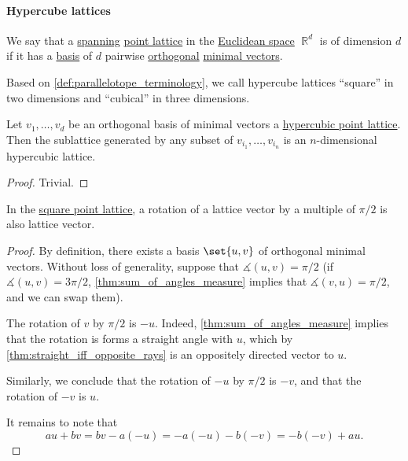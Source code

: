 \paragraph{Hypercube lattices}

\begin{definition}\label{def:hypercubic_point_lattice}
  We say that a \hyperref[thm:generated_submodule]{spanning} \hyperref[def:point_lattice]{point lattice} in the \hyperref[def:euclidean_plane]{Euclidean space} \( \BbbR^d \) is  of dimension \( d \) if it has a \hyperref[def:point_lattice_basis]{basis} of \( d \) pairwise \hyperref[def:orthogonality]{orthogonal} \hyperref[def:minimal_lattice_vector]{minimal vectors}.

  Based on \cref{def:parallelotope_terminology}, we call hypercube lattices \enquote{square} in two dimensions and \enquote{cubical} in three dimensions.
\end{definition}

\begin{proposition}\label{thm:hypercubic_point_sublattice}
  Let \( v_1, \ldots, v_d \) be an orthogonal basis of minimal vectors a \hyperref[def:hypercubic_point_lattice]{hypercubic point lattice}. Then the sublattice generated by any subset of \( v_{i_1}, \ldots, v_{i_n} \) is an \( n \)-dimensional hypercubic lattice.
\end{proposition}
\begin{proof}
  Trivial.
\end{proof}

\begin{proposition}\label{thm:hypercubic_point_lattice_vector_rotation}
  In the \hyperref[def:hypercubic_point_lattice]{square point lattice}, a rotation of a lattice vector by a multiple of \( \pi / 2 \) is also lattice vector.
\end{proposition}
\begin{proof}
  By definition, there exists a basis \( \set{ u, v } \) of orthogonal minimal vectors. Without loss of generality, suppose that \( \measuredangle(u, v) = \pi / 2 \) (if \( \measuredangle(u, v) = 3\pi / 2 \), \cref{thm:sum_of_angles_measure} implies that \( \measuredangle(v, u) = \pi / 2 \), and we can swap them).

  The rotation of \( v \) by \( \pi / 2 \) is \( -u \). Indeed, \cref{thm:sum_of_angles_measure} implies that the rotation is forms a straight angle with \( u \), which by \cref{thm:straight_iff_opposite_rays} is an oppositely directed vector to \( u \).

  Similarly, we conclude that the rotation of \( -u \) by \( \pi / 2 \) is \( -v \), and that the rotation of \( -v \) is \( u \).

  It remains to note that
  \begin{equation*}
    au + bv = bv - a(-u) = -a(-u) - b(-v) = -b(-v) + au.
  \end{equation*}
\end{proof}

